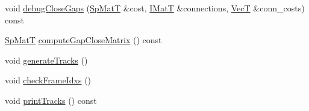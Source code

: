 \begin{DoxyCompactItemize}
\item 
void \hyperlink{classtracker_1_1LAPTrack_a52533a484c3fca552698a94785f5054a}{debug\+Close\+Gaps} (\hyperlink{classtracker_1_1LAPTrack_a85e4da204f0881dd4b46caf38bcef737}{Sp\+MatT} \&cost, \hyperlink{classtracker_1_1Tracker_a6de023cd3b5466996624c7e1b7e5d551}{I\+MatT} \&connections, \hyperlink{classtracker_1_1Tracker_a9905fa9b81b252716e651d87d7d57aff}{VecT} \&conn\+\_\+costs) const 
\item 
\hyperlink{classtracker_1_1LAPTrack_a85e4da204f0881dd4b46caf38bcef737}{Sp\+MatT} \hyperlink{classtracker_1_1LAPTrack_a3a195a7fa82a0019115bc3fd53a38e5f}{compute\+Gap\+Close\+Matrix} () const 
\item 
void \hyperlink{classtracker_1_1LAPTrack_aac61350c9f3e2c12c9aef7892a718f38}{generate\+Tracks} ()
\item 
void \hyperlink{classtracker_1_1LAPTrack_a0e7109c21c558f6ecd300f2a21416d4c}{check\+Frame\+Idxs} ()
\item 
void \hyperlink{classtracker_1_1Tracker_a5d1d2a969102d181b69b23333c874fc3}{print\+Tracks} () const 
\end{DoxyCompactItemize}
